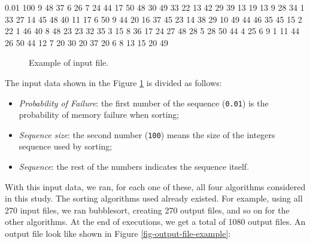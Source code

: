 \begin{verbbox}[\mbox{}]
0.01 100 9 48 37 6 26 7 24 44 17 50 48 30 49 33 22 13 42 29 39 13 19 13 9 28 
34 1 33 27 14 45 48 40 11 17 6 50 9 44 20 16 37 45 23 14 38 29 10 49 44 46 35
45 15 2 22 1 46 40 8 48 23 23 32 35 3 15 8 36 17 24 27 48 28 5 28 50 44 4 25 
6 9 1 11 44 26 50 44 12 7 20 30 20 37 20 6 8 13 15 20 49
\end{verbbox}

\begin{figure}[H]
    \centering
    \fbox{
    \theverbbox
    }
    \caption{Example of input file.}
    \label{fig-input-file-example}
\end{figure}

The input data shown in the Figure \ref{fig-input-file-example} is divided as follows:

\begin{itemize}
    \item \textit{Probability of Failure}: the first number of the sequence (\texttt{0.01}) is the probability of memory failure when sorting;
    \item \textit{Sequence size}: the second number (\texttt{100}) means the size of the integers sequence used by sorting;
    \item \textit{Sequence}: the rest of the numbers indicates the sequence itself.
\end{itemize}

With this input data, we ran, for each one of these, all four algorithms considered in this study. The sorting algorithms used already existed. For example, using all 270 input files, we ran bubblesort, creating 270 output files, and so on for the other algorithms. At the end of executions, we get a total of 1080 output files. An output file look like shown in Figure \ref{fig-output-file-example}:



